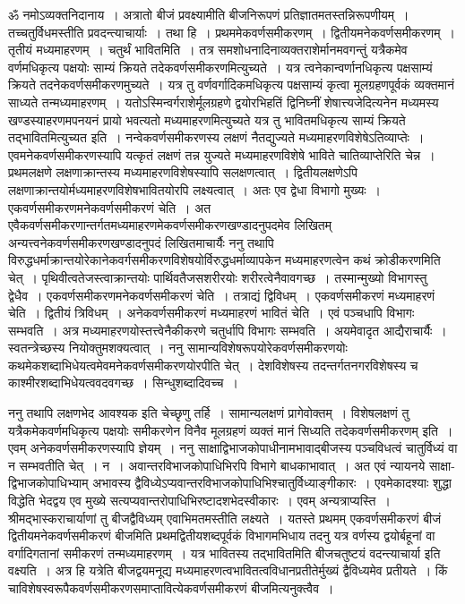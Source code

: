 \documentclass[11pt, openany]{book}
\begin{document}
 ॐ नमोऽव्यक्तनिदानाय~। अत्रातो बीजं प्रवक्ष्यामीति बीजनिरूपणं
प्रतिज्ञातमतस्तन्निरूपणीयम्~। तच्चतुर्विधमस्तीति प्रवदन्त्याचार्याः~। तथा हि~।
प्रथममेकवर्णसमीकरणम्~। द्वितीयमनेकवर्णसमीकरणम्~। तृतीयं मध्यमाहरणम्~। चतुर्थं
भावितमिति~। तत्र समशोधनादिनाव्यक्तराशेर्मानमवगन्तुं यत्रैकमेव वर्णमधिकृत्य पक्षयोः
साम्यं क्रियते तदेकवर्णसमीकरणमित्युच्यते~। यत्र त्वनेकान्वर्णानधिकृत्य
पक्षसाम्यं क्रियते 
तदनेकवर्णसमीकरणमुच्यते~। यत्र तु वर्णवर्गादिकमधिकृत्य पक्षसाम्यं
कृत्वा मूलग्रहणपूर्वकं व्यक्तमानं साध्यते तन्मध्यमाहरणम्~।
यतोऽस्मिन्वर्गराशेर्मूलग्रहणे द्वयोरभिहतिं द्विनिघ्नीं शेषात्त्यजेदित्यनेन मध्यमस्य
खण्डस्याहरणमपनयनं प्रायो 
भवत्यतो मध्यमाहरणमित्युच्यते यत्र तु भावितमधिकृत्य साम्यं क्रियते
तद्भावितमित्युच्यत इति~। नन्वेकवर्णसमीकरणस्य लक्षणं नैतद्युज्यते
मध्यमाहरणविशेषेऽतिव्याप्तेः~। 
एवमनेकवर्णसमीकरणस्यापि यत्कृतं लक्षणं तन्न युज्यते मध्यमाहरणविशेषे
भाविते 
चातिव्याप्तेरिति चेन्न~। प्रथमलक्षणे लक्षणाक्रान्तस्य
मध्यमाहरणविशेषस्यापि 
सलक्षणत्वात्~। द्वितीयलक्षणेऽपि
लक्षणाक्रान्तयोर्मध्यमाहरणविशेषभावितयोरपि लक्ष्यत्वात्~। 
अतः एव द्वेधा विभागो मुख्यः~। एकवर्णसमीकरणमनेकवर्णसमीकरणं चेति~। अत
एवैकवर्णसमीकरणान्तर्गतमध्यमाहरणमेकवर्णसमीकरणखण्डादनुपदमेव
लिखितम् अन्यत्त्वनेकवर्णसमीकरणखण्डादनुपदं लिखितमाचार्यैः ननु तथापि
विरुद्धधर्माक्रान्तयोरेकानेकवर्गसमीकरणविशेषयोर्विरुद्धधर्माव्यापकेन मध्यमाहरणत्वेन कथं
क्रोडीकरणमिति चेत्~। पृथिवीत्वतेजस्त्वाक्रान्तयोः पार्थिवतैजसशरीरयोः
शरीरत्वेनैवावगच्छ~। तस्मान्मुख्यो विभागस्तु द्वेधैव~। एकवर्णसमीकरणमनेकवर्णसमीकरणं चेति~।
तत्राद्यं 
द्विविधम्~। एकवर्णसमीकरणं मध्यमाहरणं चेति~। द्वितीयं त्रिविधम्~।
अनेकवर्णसमीकरणं मध्यमाहरणं भावितं चेति~। एवं पञ्चधापि विभागः सम्भवति~। 
अत्र मध्यमाहरणयोस्तत्त्वेनैकीकरणे चतुर्धापि विभागः सम्भवति~। अयमेवादृत 
आद्यैराचार्यैः~। स्वतन्त्रेच्छस्य नियोक्तुमशक्यत्वात्~। ननु
सामान्यविशेषरूपयोरेकवर्णसमीकरणयोः कथमेकशब्दाभिधेयत्वमेवमनेकवर्णसमीकरणयोरपीति चेत्~। देशविशेषस्य
तदन्तर्गतनगरविशेषस्य च काश्मीरशब्दाभिधेयत्ववदवगच्छ~। सिन्धुशब्दादिवच्च~।
\thispagestyle{empty}
\afterpage{\fancyhead[LE,RO]{\thepage}}
\cfoot{}
\newpage%

\noindent ननु तथापि लक्षणभेद आवश्यक इति चेच्छृणु तर्हि~। सामान्यलक्षणं
प्रागेवोक्तम्~। विशेषलक्षणं तु यत्रैकमेकवर्णमधिकृत्य पक्षयोः समीकरणेन विनैव मूलग्रहणं
व्यक्तं मानं सिध्यति तदेकवर्णसमीकरणम् इति~। एवम् अनेकवर्णसमीकरणस्यापि ज्ञेयम्~। ननु
साक्षाद्विभाजकोपाधीनामभावाद्बीजस्य पञ्चविधत्वं चातुर्विध्यं वा न
सम्भवतीति चेत्~। न~। अवान्तरविभाजकोपाधिभिरपि विभागे बाधकाभावात्~। अत एवं न्यायनये साक्षा-द्विभाजकोपाधिभ्याम् अभावस्य
द्वैविध्येऽप्यवान्तरविभाजकोपाधिभिश्चातुर्विध्याङ्गीकारः~। एवमेकादश्याः शुद्धा विद्धेति भेदद्वय एव मुख्ये
सत्यप्यवान्तरोपाधिभिरष्टादशभेदस्वीकारः~। एवम् अन्यत्राप्यस्ति~। श्रीमद्भास्कराचार्याणां
तु बीजद्वैविध्यम् एवाभिमतमस्तीति लक्ष्यते~। यतस्ते प्रथमम् एकवर्णसमीकरणं बीजं
द्वितीयमनेकवर्णसमीकरणं बीजमिति प्रथमद्वितीयशब्दपूर्वकं विभागमभिधाय तदनु
यत्र वर्णस्य द्वयोर्बहूनां वा वर्गादिगतानां समीकरणं तन्मध्यमाहरणम्~।
यत्र 
भावितस्य तद्भावितमिति बीजचतुष्टयं वदन्त्याचार्या इति वक्ष्यति~। अत्र हि
यत्रेति 
बीजद्वयमनूद्य मध्यमाहरणत्वभावितत्वविधानप्रतीतेर्मुख्यं द्वैविध्यमेव
प्रतीयते~। किं 
चाविशेषस्वरूपैकवर्णसमीकरणसमाप्तावित्येकवर्णसमीकरणं बीजमित्यनुक्त्वैव~।\\
 
\end{document}

